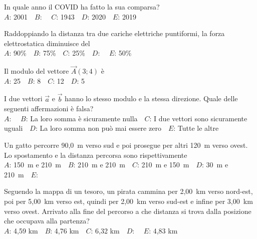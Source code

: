 \mcquestionfooter



\def\mcquestionnumber{12}


\mcquestionheader In quale anno il COVID ha fatto la sua comparsa?\\
{$A$}: 2001\ \ {$B$}: \ \ {$C$}: 1943\ \ {$D$}: 2020\ \ {$E$}: 2019\ \ 

\mcquestionfooter



\mcpaperfooter

\def\mcserialnumber{27}
\mcpaperheader


\def\mcquestionnumber{1}


\mcquestionheader Raddoppiando la distanza tra due cariche elettriche puntiformi, la forza elettrostatica diminuisce del\\
{$A$}: 90\%\ \ {$B$}: 75\%\ \ {$C$}: 25\%\ \ {$D$}: \ \ {$E$}: 50\%\ \ 

\mcquestionfooter



\def\mcquestionnumber{2}


\mcquestionheader Il modulo del vettore $\vec{A}(3;4)$ è\\
{$A$}: 25\ \ {$B$}: 8\ \ {$C$}: 12\ \ {$D$}: 5\ \ 

\mcquestionfooter



\def\mcquestionnumber{3}


\mcquestionheader I due vettori $\vec{a}$ e $\vec{b}$ hanno lo stesso modulo e la stessa direzione. Quale delle seguenti affermazioni è falsa?\\
{$A$}: \ \ {$B$}: La loro somma è sicuramente nulla\ \ {$C$}: I due vettori sono sicuramente uguali\ \ {$D$}: La loro somma non può mai essere zero\ \ {$E$}: Tutte le altre\ \ 

\mcquestionfooter



\def\mcquestionnumber{4}


\mcquestionheader Un gatto percorre 90,0~m verso sud e poi prosegue per altri 120~m verso ovest. Lo spostamento e la distanza percorsa sono rispettivamente\\
{$A$}: 150~m e 210~m\ \ {$B$}: 210~m e 210~m\ \ {$C$}: 210~m e 150~m\ \ {$D$}: 30~m e 210~m\ \ {$E$}: \ \ 

\mcquestionfooter



\def\mcquestionnumber{5}


\mcquestionheader Seguendo la mappa di un tesoro, un pirata cammina per 2,00~km verso nord-est, poi per 5,00~km verso est, quindi per 2,00~km verso sud-est e infine per 3,00~km verso ovest. Arrivato alla fine del percorso a che distanza si trova dalla posizione che occupava alla partenza?\\
{$A$}: 4,59 km\ \ {$B$}: 4,76 km\ \ {$C$}: 6,32 km\ \ {$D$}: \ \ {$E$}: 4,83 km\ \ 

